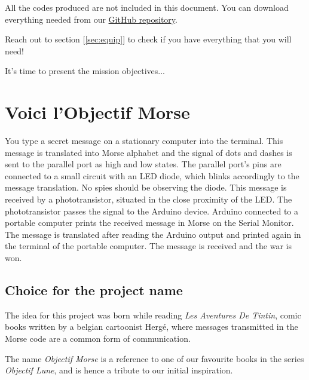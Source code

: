 \documentclass[12pt]{report}
\begin{document}
All the codes produced are not included in this document. You can download everything needed from our \href{https://github.com/camillejr/objectif_morse}{GitHub repository}.

Reach out to section [\ref{sec:equip}] to check if you have everything that you will need!

It's time to present the mission objectives...

\section{Voici l'Objectif Morse}

You type a secret message on a stationary computer into the terminal. This message is translated into Morse alphabet and the signal of dots and dashes is sent to the parallel port as high and low states. The parallel port's pins are connected to a small circuit with an LED diode, which blinks accordingly to the message translation. No spies should be observing the diode. This message is received by a phototransistor, situated in the close proximity of the LED. The phototransistor passes the signal to the Arduino device. Arduino connected to a portable computer prints the received message in Morse on the Serial Monitor. The message is translated after reading the Arduino output and printed again in the terminal of the portable computer. The message is received and the war is won.

\subsection{Choice for the project name}

The idea for this project was born while reading \textit{Les Aventures De Tintin}, comic books written by a belgian cartoonist Hergé, where messages transmitted in the Morse code are a common form of communication. 

The name \textit{Objectif Morse} is a reference to one of our favourite books in the series \textit{Objectif Lune}, and is hence a tribute to our initial inspiration.
\end{document}
